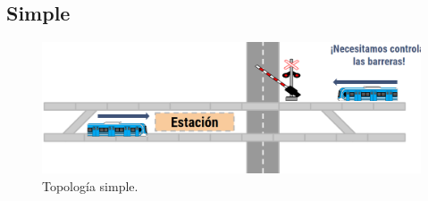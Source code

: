 \subsection{Simple}

\lipsum[1]

    \begin{figure}[h]
        \centering
        \includegraphics[width=1\textwidth]{Figuras/simple}
        \centering\caption{Topología simple.}
        \label{fig:simple_1}
    \end{figure}
    
\lipsum[1]